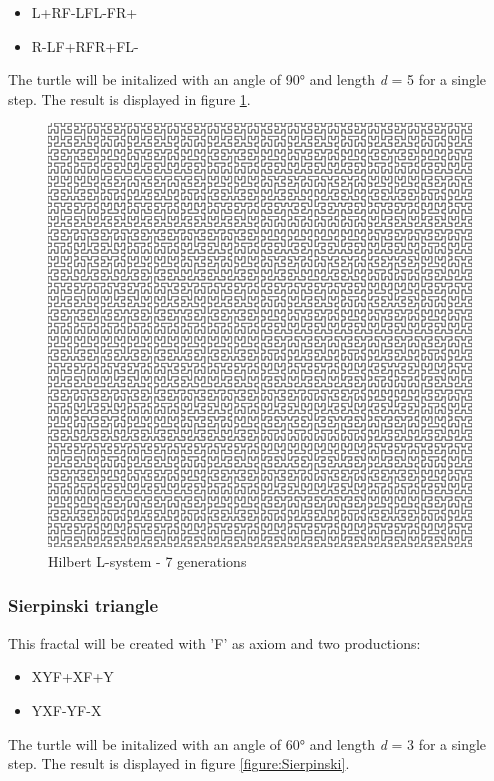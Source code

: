 \documentclass[english]{cpp-hmwk}
\begin{document}
\begin{itemize}
\item L\rightarrow +RF-LFL-FR+
\item R\rightarrow-LF+RFR+FL-
\end{itemize}


\noindent The turtle will be initalized with an angle of 90° and length \textit{d} = 5 for a single step. The result is displayed in figure \ref{figure:Hilbert}.

\begin{figure}[h!]
	\centering
	\includegraphics[width=0.6\columnwidth]{../graphs/Examples/hilbert.png}
	\caption{Hilbert L-system - 7 generations}
	\label{figure:Hilbert}
\end{figure}
 

\subsubsection{Sierpinski triangle}
This fractal will be created with 'F' as axiom and two productions:

\begin{itemize}
\item X\rightarrow YF+XF+Y
\item Y\rightarrow XF-YF-X
\end{itemize}

\noindent The turtle will be initalized with an angle of 60° and length \textit{d} = 3 for a single step. The result is displayed in figure \ref{figure:Sierpinski}.
 
\end{document}
